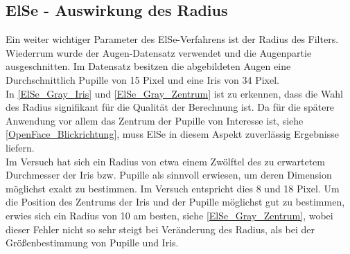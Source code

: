 \subsection{ElSe - Auswirkung des Radius}
Ein weiter wichtiger Parameter des ElSe-Verfahrens ist der Radius des Filters. Wiederrum wurde der Augen-Datensatz \cite{database_Eye} verwendet und die Augenpartie ausgeschnitten. Im Datensatz besitzen die abgebildeten Augen eine Durchschnittlich Pupille von 15 Pixel und eine Iris von 34 Pixel.\\
In \autoref{ElSe_Gray_Iris} und \autoref{ElSe_Gray_Zentrum} ist zu erkennen, dass die Wahl des Radius signifikant für die Qualität der Berechnung ist. Da für die spätere Anwendung vor allem das Zentrum der Pupille von Interesse ist, siehe \autoref{OpenFace_Blickrichtung}, muss ElSe in diesem Aspekt zuverlässig Ergebnisse liefern.\\
Im Versuch hat sich ein Radius von etwa einem Zwölftel des zu erwartetem Durchmesser der Iris bzw. Pupille als sinnvoll erwiesen, um deren Dimension möglichst exakt zu bestimmen. Im Versuch entspricht dies 8 und 18 Pixel. Um die Position des Zentrums  der Iris und der Pupille möglichst gut zu bestimmen, erwies sich ein Radius von 10 am besten, siehe \autoref{ElSe_Gray_Zentrum}, wobei dieser Fehler nicht so sehr steigt bei Veränderung des Radius, als bei der Größenbestimmung von Pupille und Iris.
